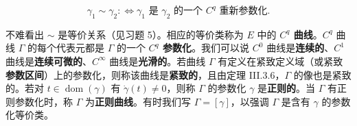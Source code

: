\begin{remark}
\begin{items}
\[
\gamma_1 \sim \gamma_2 :\Longleftrightarrow \gamma_1 \text{ 是 } \gamma_2 \text{ 的一个 } C^{q} \text{ 重新参数化} .
\]

不难看出 $ \sim $ 是等价关系（见习题 5）。相应的等价类称为 $ E $ 中的 \textbf{$ C^{q} $ 曲线}。$ C^{q} $ 曲线 $ \Gamma $ 的每个代表元都是 $ \Gamma $ 的一个 \textbf{$ C^{q} $ 参数化}。我们可以说 $ C^{0} $ 曲线是\textbf{连续的}、$ C^{1} $ 曲线是\textbf{连续可微的}、$ C^{\infty} $ 曲线是\textbf{光滑的}。若曲线 $ \Gamma $ 有定义在紧致定义域（或紧致\textbf{参数区间}）上的参数化，则称该曲线是\textbf{紧致的}，且由定理 III.3.6，$ \Gamma $ 的像也是紧致的。若对 $ t \in \operatorname{dom}(\gamma) $ 有 $ \dot{\gamma}(t) \ne 0 $，则称 $ \Gamma $ 的参数化 $ \gamma $ 是\textbf{正则的}。当 $ \Gamma $ 有正则参数化时，称 $ \Gamma $ 为\textbf{正则曲线}。有时我们写 $ \Gamma = [\gamma] $，以强调 $ \Gamma $ 是含有 $ \gamma $ 的参数化等价类。

\end{items}

\end{remark}

